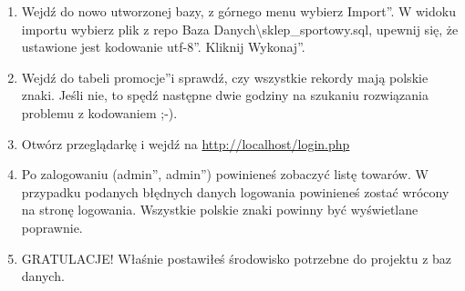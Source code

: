 \documentclass[a4paper, 11pt]{article}
\begin{document}
\begin{enumerate}
		\item Wejdź do nowo utworzonej bazy, z górnego menu wybierz \quotedblbase Import\textquotedblright. W widoku importu wybierz plik z repo Baza Danych\textbackslash sklep{\_}sportowy.sql, upewnij się, że ustawione jest kodowanie \quotedblbase utf-8\textquotedblright. Kliknij \quotedblbase Wykonaj\textquotedblright.
		\item Wejdź do tabeli \quotedblbase promocje\textquotedblright i sprawdź, czy wszystkie rekordy mają polskie znaki. Jeśli nie, to spędź następne dwie godziny na szukaniu rozwiązania problemu z kodowaniem ;-).
		\item Otwórz przeglądarkę i wejdź na \url{http://localhost/login.php}
		\item Po zalogowaniu (\quotedblbase admin\textquotedblright, \quotedblbase admin\textquotedblright) powinieneś zobaczyć listę towarów. W przypadku podanych błędnych danych logowania powinieneś zostać wrócony na stronę logowania. Wszystkie polskie znaki powinny być wyświetlane poprawnie.
		\item GRATULACJE! Właśnie postawiłeś środowisko potrzebne do projektu z baz danych.
	\end{enumerate}
\end{document}

